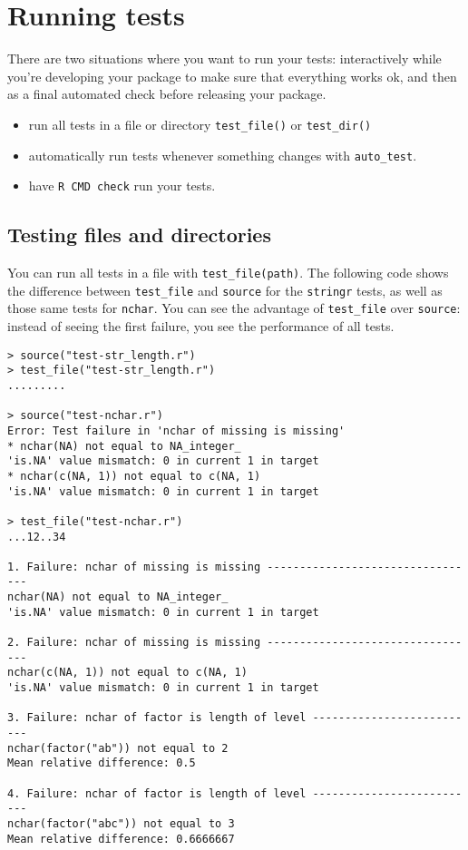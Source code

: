 \section{Running tests}

There are two situations where you want to run your tests: interactively
while you're developing your package to make sure that everything works
ok, and then as a final automated check before releasing your package.

\begin{itemize}
\item
  run all tests in a file or directory \texttt{test\_file()} or
  \texttt{test\_dir()}
\item
  automatically run tests whenever something changes with
  \texttt{auto\_test}.
\item
  have \texttt{R CMD check} run your tests.
\end{itemize}

\subsection{Testing files and directories}

You can run all tests in a file with \texttt{test\_file(path)}. The
following code shows the difference between \texttt{test\_file} and
\texttt{source} for the \texttt{stringr} tests, as well as those same
tests for \texttt{nchar}. You can see the advantage of
\texttt{test\_file} over \texttt{source}: instead of seeing the first
failure, you see the performance of all tests.

\begin{verbatim}
> source("test-str_length.r")
> test_file("test-str_length.r")
.........

> source("test-nchar.r")
Error: Test failure in 'nchar of missing is missing'
* nchar(NA) not equal to NA_integer_
'is.NA' value mismatch: 0 in current 1 in target
* nchar(c(NA, 1)) not equal to c(NA, 1)
'is.NA' value mismatch: 0 in current 1 in target

> test_file("test-nchar.r")
...12..34

1. Failure: nchar of missing is missing ---------------------------------
nchar(NA) not equal to NA_integer_
'is.NA' value mismatch: 0 in current 1 in target

2. Failure: nchar of missing is missing ---------------------------------
nchar(c(NA, 1)) not equal to c(NA, 1)
'is.NA' value mismatch: 0 in current 1 in target

3. Failure: nchar of factor is length of level --------------------------
nchar(factor("ab")) not equal to 2
Mean relative difference: 0.5

4. Failure: nchar of factor is length of level --------------------------
nchar(factor("abc")) not equal to 3
Mean relative difference: 0.6666667
\end{verbatim}

